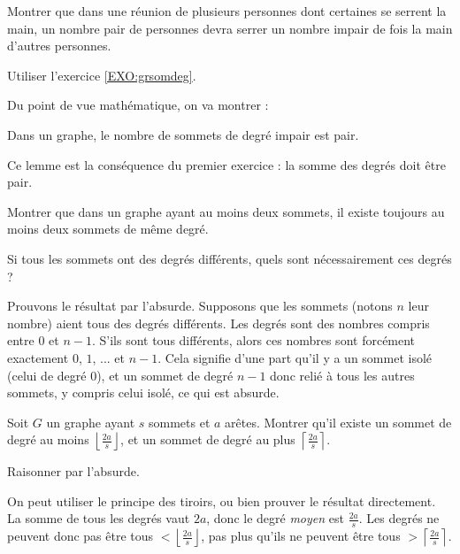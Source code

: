 \begin{exo}%
Montrer que dans une réunion de plusieurs personnes dont certaines se serrent la main, un nombre pair de personnes devra serrer un nombre impair de fois la main d'autres personnes.
\begin{hint}
Utiliser l'exercice \ref{EXO:grsomdeg}.
\end{hint}
\begin{sol}
Du point de vue mathématique, on va montrer : 
\begin{lemme}
Dans un graphe, le nombre de sommets de degré impair est pair.
\end{lemme}
Ce lemme est la conséquence du premier exercice : la somme des degrés doit être pair.
\end{sol}
\end{exo}

\begin{exo}
Montrer que dans un graphe ayant au moins deux sommets, il existe toujours au moins deux sommets de même degré.
\begin{hint}
Si tous les sommets ont des degrés différents, quels sont nécessairement ces degrés ? 
\end{hint}
\begin{sol}Prouvons le résultat par l'absurde. Supposons que les sommets (notons $n$ leur nombre) aient tous des degrés différents. Les degrés sont des nombres compris entre $0$ et $n-1$. S'ils sont tous différents, alors ces nombres sont forcément exactement $0$, $1$, ... et $n-1$. Cela signifie d'une part qu'il y a un sommet isolé (celui de degré $0$), et un sommet de degré $n-1$ donc relié à tous les autres sommets, y compris celui isolé, ce qui est absurde.
\end{sol}
\end{exo}

\begin{exo}
Soit $G$ un graphe ayant $s$ sommets et $a$ arêtes. Montrer qu'il existe un sommet de degré au moins $\left\lfloor \frac{2a}{s}\right\rfloor$, et un sommet de degré au plus $\left\lceil  \frac{2a}{s}\right\rceil$.
\begin{hint}
Raisonner par l'absurde.
\end{hint}
\begin{sol}
On peut utiliser le principe des tiroirs, ou bien prouver le résultat directement. La somme de tous les degrés vaut $2a$, donc le degré \emph{moyen} est $\frac{2a}{s}$. Les degrés ne peuvent donc pas être tous $<\left\lfloor \frac{2a}{s}\right\rfloor$, pas plus qu'ils ne peuvent être tous $>\left\lceil  \frac{2a}{s}\right\rceil$.
\end{sol}
\end{exo}

